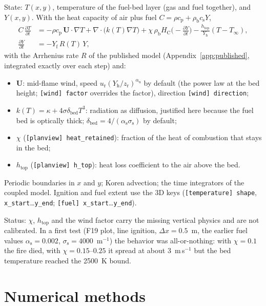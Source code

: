 \documentclass[11pt,a4paper]{article}
\newcommand{\code}[1]{\texttt{#1}}
\begin{document}
State: $T(x,y)$, temperature of the fuel-bed layer (gas and fuel together), and $Y(x,y)$. With the
heat capacity of air plus fuel $C=\rho c_\text{p}+\rho_\text{b}c_\text{s}Y$,
\begin{align}
  C\,\frac{\partial T}{\partial t} &= -\rho c_\text{p}\,\mathbf{U}\cdot\nabla T + \nabla\cdot\big(k(T)\nabla T\big)
    + \chi\,\rho_\text{b} H_\text{C}\Big(-\frac{\partial Y}{\partial t}\Big) - \frac{h_\text{top}}{Y_\text{h}}(T-T_\infty),\\
  \frac{\partial Y}{\partial t} &= -Y_\text{f}\,R(T)\,Y,
\end{align}
with the Arrhenius rate $R$ of the published model (Appendix~\ref{app:published}, integrated
exactly over each step) and:
\begin{itemize}
  \item $\mathbf{U}$: mid-flame wind, speed $u_\text{r}(Y_\text{h}/z_\text{r})^{\alpha_\text{u}}$ by default (the power law at
        the bed height; \code{[wind] factor} overrides the factor), direction \code{[wind] direction};
  \item $k(T)=\kappa+4\sigma\delta_\text{bed}T^3$: radiation as diffusion, justified here because the fuel
        bed is optically thick; $\delta_\text{bed}=4/(\alpha_\text{s}\sigma_\text{s})$ by default;
  \item $\chi$ (\code{[planview] heat\_retained}): fraction of the heat of combustion that stays in the bed;
  \item $h_\text{top}$ (\code{[planview] h\_top}): heat loss coefficient to the air above the bed.
\end{itemize}
Periodic boundaries in $x$ and $y$; Koren advection; the time integrators of the coupled model.
Ignition and fuel extent use the 3D keys (\code{[temperature] shape}, \code{x\_start}\dots\code{y\_end};
\code{[fuel] x\_start}\dots\code{y\_end}).

Status: $\chi$, $h_\text{top}$ and the wind factor carry the missing vertical physics and are not
calibrated. In a first test (F19 plot, line ignition, $\Delta x=0.5$~m, the earlier fuel values
$\alpha_\text{s}=0.002$, $\sigma_\text{s}=4000$~m$^{-1}$) the behavior was all-or-nothing: with $\chi=0.1$ the fire
died, with $\chi=0.15$--$0.25$ it spread at about 3~m\,s$^{-1}$ but the bed temperature reached the
2500~K bound.

\section{Numerical methods}\label{sec:numerics}
\end{document}
